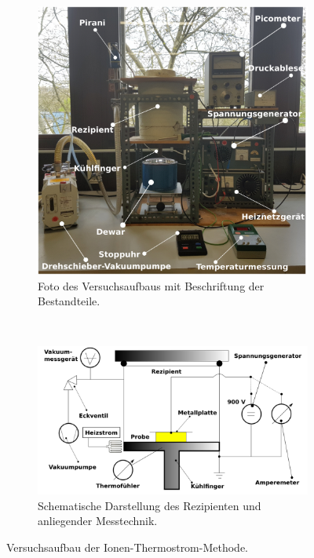 \begin{figure}
    \centering
    \begin{subfigure}[t]{0.5\linewidth}
        \centering
        \includegraphics[width=\linewidth]{Bilder/Aufbau.jpeg}
        \caption{Foto des Versuchsaufbaus mit Beschriftung der Bestandteile.}
        \label{pic:Aufbau_Foto}
    \end{subfigure}%
    ~ 
    \begin{subfigure}[t]{0.5\linewidth}
        \centering
        \includegraphics[width=\linewidth]{Bilder/Rezipient.jpeg}
        \caption{Schematische Darstellung des Rezipienten und anliegender Messtechnik.}
        \label{pic:Rezipient_Foto}
    \end{subfigure}
    \caption{Versuchsaufbau der Ionen-Thermostrom-Methode.\cite{anleitungV48}}
    \label{pic:Gesamter_Versuchsaufbau}
\end{figure}
\FloatBarrier

